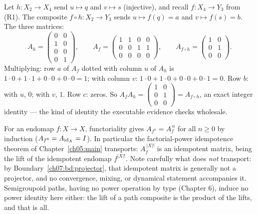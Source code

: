 \begin{example}\label{ch07:ex:functorexample}
Let $h:X_2\to X_4$ send $u\mapsto q$ and $v\mapsto s$ (injective), and
recall $f:X_4\to Y_3$ from (R1). The composite $f\circ h:X_2\to Y_3$ sends
$u\mapsto f(q)=a$ and $v\mapsto f(s)=b$. The three matrices:
\[
A_h=\begin{pmatrix}0&0\\1&0\\0&0\\0&1\end{pmatrix},\qquad
A_f=\begin{pmatrix}1&1&0&0\\0&0&1&1\\0&0&0&0\end{pmatrix},\qquad
A_{f\circ h}=\begin{pmatrix}1&0\\0&1\\0&0\end{pmatrix}.
\]
Multiplying: row $a$ of $A_f$ dotted with column $u$ of $A_h$ is
$1{\cdot}0+1{\cdot}1+0{\cdot}0+0{\cdot}0=1$; with column $v$:
$1{\cdot}0+1{\cdot}0+0{\cdot}0+0{\cdot}1=0$. Row $b$: with $u$, $0$; with
$v$, $1$. Row $c$: zeros. So
$A_fA_h=\left(\begin{smallmatrix}1&0\\0&1\\0&0\end{smallmatrix}\right)
=A_{f\circ h}$, an exact integer identity --- the kind of identity the
executable evidence checks wholesale.
\end{example}

\begin{remark}\label{ch07:rem:powers}
For an endomap $f:X\to X$, functoriality gives $A_{f^n}=A_f^{\,n}$ for all
$n\ge 0$ by induction ($A_{f^0}=A_{\mathrm{id}_X}=I$). In particular the
factorial-power idempotence theorem of Chapter~\ref{ch05:main} transports:
$A_f^{\,|X|!}$ is an idempotent matrix, being the lift of the idempotent
endomap $f^{|X|!}$. Note carefully what does \emph{not} transport: by
Boundary~\ref{ch07:bd:projector}, that idempotent matrix is generally not a
projector, and no convergence, mixing, or dynamical statement accompanies
it. Semigroupoid paths, having no power operation by type
(Chapter 6), induce no power identity here either: the lift of
a path composite is the product of the lifts, and that is all.
\end{remark}

